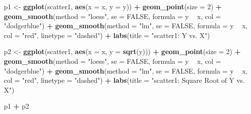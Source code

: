 \documentclass[
]{book}
\newenvironment{Shaded}{\begin{snugshade}}{\end{snugshade}}
\newcommand{\DataTypeTok}[1]{\textcolor[rgb]{0.13,0.29,0.53}{#1}}
\newcommand{\DecValTok}[1]{\textcolor[rgb]{0.00,0.00,0.81}{#1}}
\newcommand{\KeywordTok}[1]{\textcolor[rgb]{0.13,0.29,0.53}{\textbf{#1}}}
\newcommand{\NormalTok}[1]{#1}
\newcommand{\OperatorTok}[1]{\textcolor[rgb]{0.81,0.36,0.00}{\textbf{#1}}}
\newcommand{\OtherTok}[1]{\textcolor[rgb]{0.56,0.35,0.01}{#1}}
\newcommand{\StringTok}[1]{\textcolor[rgb]{0.31,0.60,0.02}{#1}}
\begin{document}
\begin{Shaded}
\begin{Highlighting}[]
\NormalTok{p1 <-}\StringTok{ }\KeywordTok{ggplot}\NormalTok{(scatter1, }\KeywordTok{aes}\NormalTok{(}\DataTypeTok{x =}\NormalTok{ x, }\DataTypeTok{y =}\NormalTok{ y)) }\OperatorTok{+}
\StringTok{    }\KeywordTok{geom_point}\NormalTok{(}\DataTypeTok{size =} \DecValTok{2}\NormalTok{) }\OperatorTok{+}
\StringTok{    }\KeywordTok{geom_smooth}\NormalTok{(}\DataTypeTok{method =} \StringTok{"loess"}\NormalTok{, }\DataTypeTok{se =} \OtherTok{FALSE}\NormalTok{, }
                \DataTypeTok{formula =}\NormalTok{ y }\OperatorTok{~}\StringTok{ }\NormalTok{x, }\DataTypeTok{col =} \StringTok{"dodgerblue"}\NormalTok{) }\OperatorTok{+}
\StringTok{    }\KeywordTok{geom_smooth}\NormalTok{(}\DataTypeTok{method =} \StringTok{"lm"}\NormalTok{, }\DataTypeTok{se =} \OtherTok{FALSE}\NormalTok{, }
                \DataTypeTok{formula =}\NormalTok{ y }\OperatorTok{~}\StringTok{ }\NormalTok{x, }\DataTypeTok{col =} \StringTok{"red"}\NormalTok{, }\DataTypeTok{linetype =} \StringTok{"dashed"}\NormalTok{) }\OperatorTok{+}
\StringTok{    }\KeywordTok{labs}\NormalTok{(}\DataTypeTok{title =} \StringTok{"scatter1: Y vs. X"}\NormalTok{)}

\NormalTok{p2 <-}\StringTok{ }\KeywordTok{ggplot}\NormalTok{(scatter1, }\KeywordTok{aes}\NormalTok{(}\DataTypeTok{x =}\NormalTok{ x, }\DataTypeTok{y =} \KeywordTok{sqrt}\NormalTok{(y))) }\OperatorTok{+}
\StringTok{    }\KeywordTok{geom_point}\NormalTok{(}\DataTypeTok{size =} \DecValTok{2}\NormalTok{) }\OperatorTok{+}
\StringTok{    }\KeywordTok{geom_smooth}\NormalTok{(}\DataTypeTok{method =} \StringTok{"loess"}\NormalTok{, }\DataTypeTok{se =} \OtherTok{FALSE}\NormalTok{, }
                \DataTypeTok{formula =}\NormalTok{ y }\OperatorTok{~}\StringTok{ }\NormalTok{x, }\DataTypeTok{col =} \StringTok{"dodgerblue"}\NormalTok{) }\OperatorTok{+}
\StringTok{    }\KeywordTok{geom_smooth}\NormalTok{(}\DataTypeTok{method =} \StringTok{"lm"}\NormalTok{, }\DataTypeTok{se =} \OtherTok{FALSE}\NormalTok{, }
                \DataTypeTok{formula =}\NormalTok{ y }\OperatorTok{~}\StringTok{ }\NormalTok{x, }\DataTypeTok{col =} \StringTok{"red"}\NormalTok{, }\DataTypeTok{linetype =} \StringTok{"dashed"}\NormalTok{) }\OperatorTok{+}
\StringTok{    }\KeywordTok{labs}\NormalTok{(}\DataTypeTok{title =} \StringTok{"scatter1: Square Root of Y vs. X"}\NormalTok{)}

\NormalTok{p1 }\OperatorTok{+}\StringTok{ }\NormalTok{p2}
\end{Highlighting}
\end{Shaded}
\end{document}

